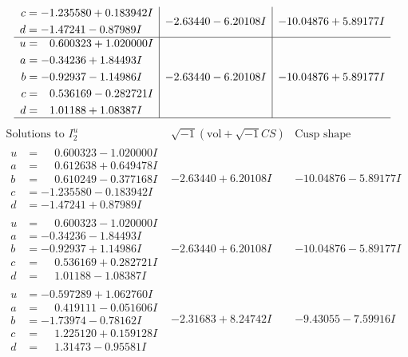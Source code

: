 \documentclass[1p]{elsarticle_modified}
\theoremstyle{definition}
\newcommand{\I}{\sqrt{-1}}
\begin{document}
$$\begin{array}{c|c|c}
\begin{aligned}
c &= -1.235580 + 0.183942 I \\
d &= -1.47241 - 0.87989 I\end{aligned}
 & -2.63440 - 6.20108 I & -10.04876 + 5.89177 I \\ \hline\begin{aligned}
u &= \phantom{-}0.600323 + 1.020000 I \\
a &= -0.34236 + 1.84493 I \\
b &= -0.92937 - 1.14986 I \\
c &= \phantom{-}0.536169 - 0.282721 I \\
d &= \phantom{-}1.01188 + 1.08387 I\end{aligned}
 & -2.63440 - 6.20108 I & -10.04876 + 5.89177 I\\
 \hline 
 \end{array}$$\newpage$$\begin{array}{c|c|c}  
\text{Solutions to }I^u_{2}& \I (\text{vol} + \sqrt{-1}CS) & \text{Cusp shape}\\
 \hline 
\begin{aligned}
u &= \phantom{-}0.600323 - 1.020000 I \\
a &= \phantom{-}0.612638 + 0.649478 I \\
b &= \phantom{-}0.610249 - 0.377168 I \\
c &= -1.235580 - 0.183942 I \\
d &= -1.47241 + 0.87989 I\end{aligned}
 & -2.63440 + 6.20108 I & -10.04876 - 5.89177 I \\ \hline\begin{aligned}
u &= \phantom{-}0.600323 - 1.020000 I \\
a &= -0.34236 - 1.84493 I \\
b &= -0.92937 + 1.14986 I \\
c &= \phantom{-}0.536169 + 0.282721 I \\
d &= \phantom{-}1.01188 - 1.08387 I\end{aligned}
 & -2.63440 + 6.20108 I & -10.04876 - 5.89177 I \\ \hline\begin{aligned}
u &= -0.597289 + 1.062760 I \\
a &= \phantom{-}0.419111 - 0.051606 I \\
b &= -1.73974 - 0.78162 I \\
c &= \phantom{-}1.225120 + 0.159128 I \\
d &= \phantom{-}1.31473 - 0.95581 I\end{aligned}
 & -2.31683 + 8.24742 I & -9.43055 - 7.59916 I \\ \hline\begin{aligned}

\end{aligned}
\end{array}$$
\end{document}
